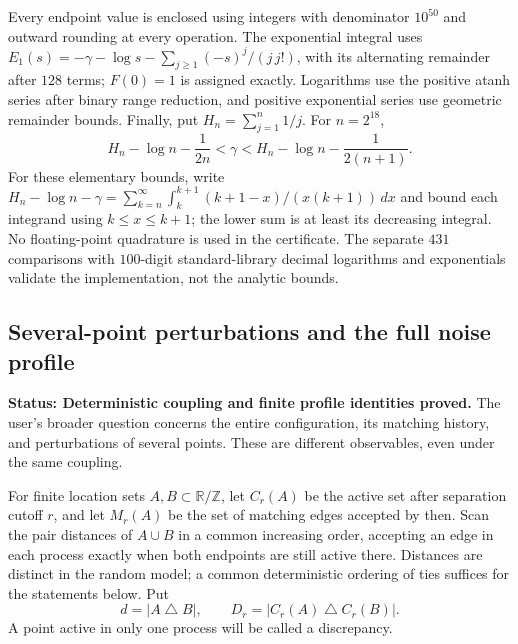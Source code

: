 \documentclass[11pt,letterpaper]{article}
\newcommand{\T}{\mathbb R/\mathbb Z}\newcommand{\Leb}{\operatorname{Leb}}
\newcommand{\status}[1]{\textbf{Status: #1.}}
\begin{document}
Every endpoint value is enclosed using integers with denominator
$10^{50}$ and outward rounding at every operation. The exponential
integral uses
$E_1(s)=-\gamma-\log s-\sum_{j\ge1}(-s)^j/(j\,j!)$,
with its alternating remainder after $128$ terms;
$F(0)=1$ is assigned exactly. Logarithms use the positive
atanh series after binary range reduction, and positive exponential
series use geometric remainder bounds. Finally, put
$H_n=\sum_{j=1}^n1/j$. For $n=2^{18}$,
\[
 H_n-\log n-\frac1{2n}<\gamma
       <H_n-\log n-\frac1{2(n+1)}.
\]
For these elementary bounds, write
$H_n-\log n-\gamma=\sum_{k=n}^\infty
\int_k^{k+1}(k+1-x)/(x(k+1))\,dx$ and bound each integrand using
$k\le x\le k+1$; the lower sum is at least its decreasing integral.
No floating-point quadrature is used in the certificate.
The separate $431$ comparisons with $100$-digit standard-library
decimal logarithms and exponentials validate the implementation,
not the analytic bounds.

\subsection{Several-point perturbations and the full noise profile}
\label{sec:perturbations}

\status{Deterministic coupling and finite profile identities proved}
The user's broader question concerns the entire configuration, its
matching history, and perturbations of several points. These are
different observables, even under the same coupling.

For finite location sets $A,B\subset\T$, let $C_r(A)$ be the active set
after separation cutoff $r$, and let $M_r(A)$ be the set of matching
edges accepted by then. Scan the pair distances of $A\cup B$ in a
common increasing order, accepting an edge in each process exactly
when both endpoints are still active there. Distances are distinct
in the random model; a common deterministic ordering of ties suffices
for the statements below. Put
\[
 d=|A\mathbin\triangle B|,\qquad
 D_r=|C_r(A)\mathbin\triangle C_r(B)|.
\]
A point active in only one process will be called a discrepancy.
\end{document}
